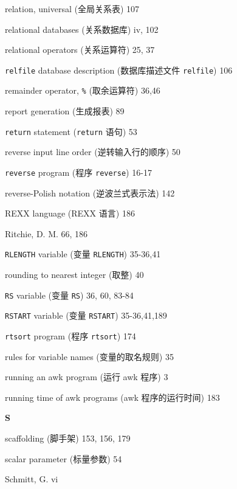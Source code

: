 \begin{multicols}{2}
\hangindent=2pc  relation, universal (全局关系表) 107

\hangindent=2pc  relational databases (关系数据库) iv, 102

\hangindent=2pc  relational operators (关系运算符) 25, 37

\hangindent=2pc  \verb'relfile' database description
(数据库描述文件 \verb'relfile') 106

\hangindent=2pc  remainder operator, \verb'%' (取余运算符) 36,46

\hangindent=2pc  report generation (生成报表) 89

\hangindent=2pc  \verb'return' statement (\verb'return' 语句) 53

\hangindent=2pc  reverse input line order (逆转输入行的顺序) 50

\hangindent=2pc  \verb'reverse' program (程序 \verb'reverse') 16-17

\hangindent=2pc  reverse-Polish notation (逆波兰式表示法) 142

\hangindent=2pc  REXX language (REXX 语言) 186

\hangindent=2pc  Ritchie, D. M. 66, 186

\hangindent=2pc  \verb'RLENGTH' variable (变量 \verb'RLENGTH')
35-36,41

\hangindent=2pc  rounding to nearest integer (取整) 40

\hangindent=2pc  \verb'RS' variable (变量 \verb'RS') 36, 60, 83-84

\hangindent=2pc  \verb'RSTART' variable (变量 \verb'RSTART')
35-36,41,189

\hangindent=2pc  \verb'rtsort' program (程序 \verb'rtsort') 174

\hangindent=2pc  rules for variable names (变量的取名规则) 35

\hangindent=2pc  running an awk program (运行 awk 程序) 3

\hangindent=2pc  running time of awk programs (awk
程序的运行时间) 183

\medskip\textbf{\large{S}}

\hangindent=2pc  scaffolding (脚手架) 153, 156, 179

\hangindent=2pc  scalar parameter (标量参数) 54

\hangindent=2pc  Schmitt, G. vi


\end{multicols}
